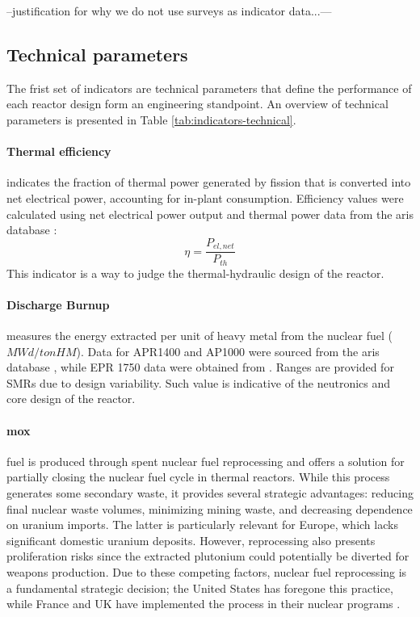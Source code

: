 --justification for why we do not use surveys as indicator data...---

\subsection{Technical parameters}
The frist set of indicators are technical parameters that define the performance of each reactor design form an engineering standpoint.
An overview of technical parameters is presented in Table \ref{tab:indicators-technical}.
\paragraph{Thermal efficiency} indicates the fraction of thermal power generated by fission that is converted into net electrical power, accounting for in-plant consumption. Efficiency values were calculated using net electrical power output and thermal power data from the \gls{aris} database \cite{iaea2025aris}:
$$
\eta = \frac{P_{el,net}}{P_{th}}
$$
This indicator is a way to judge the thermal-hydraulic design of the reactor.

\paragraph{Discharge Burnup} measures the energy extracted per unit of heavy metal from the nuclear fuel ($MWd/tonHM$). Data for APR1400 and AP1000 were sourced from the \gls{aris} database \cite{iaea2025aris}, while EPR 1750 data were obtained from \cite{NRC_ML052280170}. Ranges are provided for SMRs due to design variability. Such value is indicative of the neutronics and core design of the reactor.

\paragraph{\gls{mox}} fuel is produced through spent nuclear fuel reprocessing and offers a solution for partially closing the nuclear fuel cycle in thermal reactors. While this process generates some secondary waste, it provides several strategic advantages: reducing final nuclear waste volumes, minimizing mining waste, and decreasing dependence on uranium imports. The latter is particularly relevant for Europe, which lacks significant domestic uranium deposits. However, reprocessing also presents proliferation risks since the extracted plutonium could potentially be diverted for weapons production. Due to these competing factors, nuclear fuel reprocessing is a fundamental strategic decision; the United States has foregone this practice, while France and UK have implemented the process in their nuclear programs \cite{CRS_Reprocessing_Spent_Fuel_2025}.

